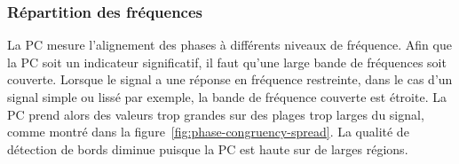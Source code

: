 \subsubsection{Répartition des fréquences}

La PC mesure l'alignement des phases à différents niveaux de fréquence. Afin que la PC soit un indicateur significatif, il faut qu'une large bande de fréquences soit couverte. Lorsque le signal a une réponse en fréquence restreinte, dans le cas d'un signal simple ou lissé par exemple, la bande de fréquence couverte est étroite. La PC prend alors des valeurs trop grandes sur des plages trop larges du signal, comme montré dans la figure~\ref{fig:phase-congruency-spread}. La qualité de détection de bords diminue puisque la PC est haute sur de larges régions.

\bigskip

